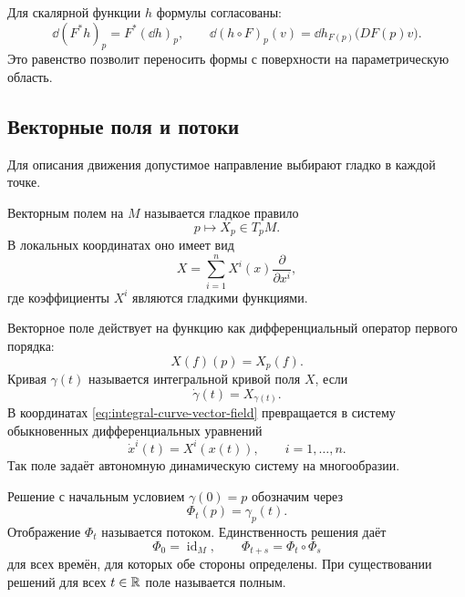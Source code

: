 Для скалярной функции \(h\) формулы согласованы:
\begin{equation}
\label{eq:differential-pullback-chain-rule}
\dd(F^*h)_p
=
F^*(\dd h)_{p},
\qquad
\dd(h\circ F)_p(v)
=
\dd h_{F(p)}\bigl(DF(p)v\bigr).
\end{equation}
Это равенство позволит переносить формы с поверхности на параметрическую область.

\subsection{Векторные поля и потоки}

Для описания движения допустимое направление выбирают гладко в каждой точке.

\begin{definition}
Векторным полем на \(M\) называется гладкое правило
\[
p\longmapsto X_p\in T_pM.
\]
В локальных координатах оно имеет вид
\begin{equation}
\label{eq:vector-field-local-form}
X
=
\sum_{i=1}^n X^i(x)
\frac{\partial}{\partial x^i},
\end{equation}
где коэффициенты \(X^i\) являются гладкими функциями.
\end{definition}

Векторное поле действует на функцию как дифференциальный оператор первого порядка:
\[
X(f)(p)=X_p(f).
\]
Кривая \(\gamma(t)\) называется интегральной кривой поля \(X\), если
\begin{equation}
\label{eq:integral-curve-vector-field}
\dot\gamma(t)=X_{\gamma(t)}.
\end{equation}
В координатах \eqref{eq:integral-curve-vector-field} превращается в систему обыкновенных дифференциальных уравнений
\begin{equation}
\label{eq:vector-field-coordinate-ode}
\dot x^i(t)=X^i(x(t)),
\qquad
i=1,\ldots,n.
\end{equation}
Так поле задаёт автономную динамическую систему на многообразии.

Решение с начальным условием \(\gamma(0)=p\) обозначим через
\[
\Phi_t(p)=\gamma_p(t).
\]
Отображение \(\Phi_t\) называется потоком. Единственность решения даёт
\begin{equation}
\label{eq:flow-group-property}
\Phi_0=\operatorname{id}_M,
\qquad
\Phi_{t+s}=\Phi_t\circ\Phi_s
\end{equation}
для всех времён, для которых обе стороны определены. При существовании решений для всех \(t\in\mathbb{R}\) поле называется полным.

